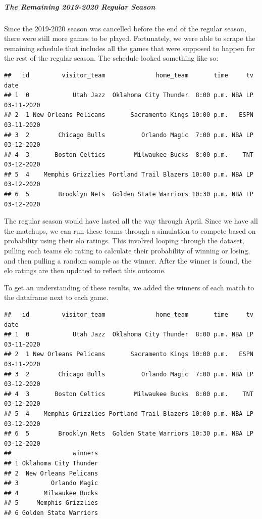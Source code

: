 \documentclass[]{article}
\let\oldsubparagraph\subparagraph
\renewcommand{\subparagraph}[1]{\oldsubparagraph{#1}\mbox{}}
\begin{document}
\hypertarget{the-remaining-2019-2020-regular-season}{%
\subparagraph{The Remaining 2019-2020 Regular
Season}\label{the-remaining-2019-2020-regular-season}}

Since the 2019-2020 season was cancelled before the end of the regular
season, there were still more games to be played. Fortunately, we were
able to scrape the remaining schedule that includes all the games that
were supposed to happen for the rest of the regular season. The schedule
looked something like so:

\begin{verbatim}
##   id         visitor_team              home_team       time     tv       date
## 1  0            Utah Jazz  Oklahoma City Thunder  8:00 p.m. NBA LP 03-11-2020
## 2  1 New Orleans Pelicans       Sacramento Kings 10:00 p.m.   ESPN 03-11-2020
## 3  2        Chicago Bulls          Orlando Magic  7:00 p.m. NBA LP 03-12-2020
## 4  3       Boston Celtics        Milwaukee Bucks  8:00 p.m.    TNT 03-12-2020
## 5  4    Memphis Grizzlies Portland Trail Blazers 10:00 p.m. NBA LP 03-12-2020
## 6  5        Brooklyn Nets  Golden State Warriors 10:30 p.m. NBA LP 03-12-2020
\end{verbatim}

The regular season would have lasted all the way through April. Since we
have all the matchups, we can run these teams through a simulation to
compete based on probability using their elo ratings. This involved
looping through the dataset, pulling each teams elo rating to calculate
their probability of winning or losing, and then pulling a random sample
as the winner. After the winner is found, the elo ratings are then
updated to reflect this outcome.

To get an understanding of these results, we added the winners of each
match to the dataframe next to each game.

\begin{verbatim}
##   id         visitor_team              home_team       time     tv       date
## 1  0            Utah Jazz  Oklahoma City Thunder  8:00 p.m. NBA LP 03-11-2020
## 2  1 New Orleans Pelicans       Sacramento Kings 10:00 p.m.   ESPN 03-11-2020
## 3  2        Chicago Bulls          Orlando Magic  7:00 p.m. NBA LP 03-12-2020
## 4  3       Boston Celtics        Milwaukee Bucks  8:00 p.m.    TNT 03-12-2020
## 5  4    Memphis Grizzlies Portland Trail Blazers 10:00 p.m. NBA LP 03-12-2020
## 6  5        Brooklyn Nets  Golden State Warriors 10:30 p.m. NBA LP 03-12-2020
##                 winners
## 1 Oklahoma City Thunder
## 2  New Orleans Pelicans
## 3         Orlando Magic
## 4       Milwaukee Bucks
## 5     Memphis Grizzlies
## 6 Golden State Warriors
\end{verbatim}
\end{document}
